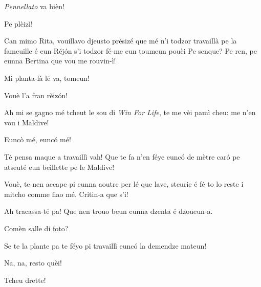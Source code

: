\begin{drama}
\Eumprezeospeaks \textit{Pennellato} va bièn!

\Ritaspeaks {} Pe plèizì!

\Tobiespeaks Can mimo Rita, vouillavo djeusto présizé que mé n’i todzor travaillà pe la fameuille é eun Réjón s’i todzor fé-me eun toumeun pouèi  Pe senque? Pe ren, pe eunna Bertina que vou me rouvin-ì!

\Eumprezeospeaks Mi planta-là lé va, tomeun!

\Bertinaspeaks Vouè l’a fran rèizón!

\Tobiespeaks  {} Ah mi se gagno mé tcheut le sou di \textit{Win For Life}, te me vèi pamì cheu: me n'en vou i Maldive!

\Simonspeaks Eunc\`o mé, eunc\'o mé!

\Eumprezeospeaks Té pensa maque a travaillì vah! Que te fa n'en féye eunc\'o de mètre caró pe atseuté eun beillette pe le Maldive!

\Bertinaspeaks {} Vouè, te nen accape pi eunna aoutre per lé que lave, steurie é fé to lo reste i mitcho comme fiao mé. Critin-a que s’i!

\Tobiespeaks Ah tracassa-té pa! Que nen trouo beun eunna dzenta é dzoueun-a.

\Simonspeaks Comèn salle di foto?

\Eumprezeospeaks Se te la plante pa te féyo pi travaillì eunc\'o la demendze mateun!

\Simonspeaks Na, na, resto quèi!


\Pascalspeaks Tcheu drette!



\end{drama}
